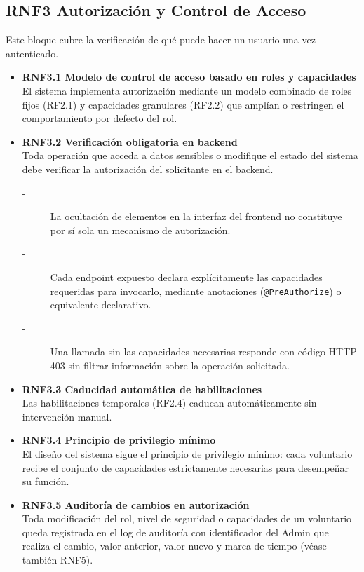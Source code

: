 \subsection{RNF3 Autorización y Control de Acceso}
Este bloque cubre la verificación de qué puede hacer un usuario una
vez autenticado.
\begin{itemize}
    \item \textbf{RNF3.1 Modelo de control de acceso basado en roles y capacidades} \\
    El sistema implementa autorización mediante un modelo combinado de
    roles fijos (RF2.1) y capacidades granulares (RF2.2) que amplían o
    restringen el comportamiento por defecto del rol.


    \item \textbf{RNF3.2 Verificación obligatoria en backend} \\
    Toda operación que acceda a datos sensibles o modifique el estado
    del sistema debe verificar la autorización del solicitante en el
    backend.
    \begin{description}
        \item[-] La ocultación de elementos en la interfaz del frontend no
        constituye por sí sola un mecanismo de autorización. 
        \item[-] Cada endpoint expuesto declara explícitamente las capacidades
        requeridas para invocarlo, mediante anotaciones (\texttt{@PreAuthorize})
        o equivalente declarativo.
        \item[-] Una llamada sin las capacidades necesarias responde con código
        HTTP 403 sin filtrar información sobre la operación solicitada.
    \end{description}


    \item \textbf{RNF3.3 Caducidad automática de habilitaciones} \\
    Las habilitaciones temporales (RF2.4) caducan automáticamente sin intervención manual.


    \item \textbf{RNF3.4 Principio de privilegio mínimo} \\
    El diseño del sistema sigue el principio de privilegio mínimo: cada
    voluntario recibe el conjunto de capacidades estrictamente necesarias
    para desempeñar su función.


    \item \textbf{RNF3.5 Auditoría de cambios en autorización} \\
    Toda modificación del rol, nivel de seguridad o capacidades de un
    voluntario queda registrada en el log de auditoría con identificador
    del Admin que realiza el cambio, valor anterior, valor nuevo y marca
    de tiempo (véase también RNF5).
\end{itemize}


